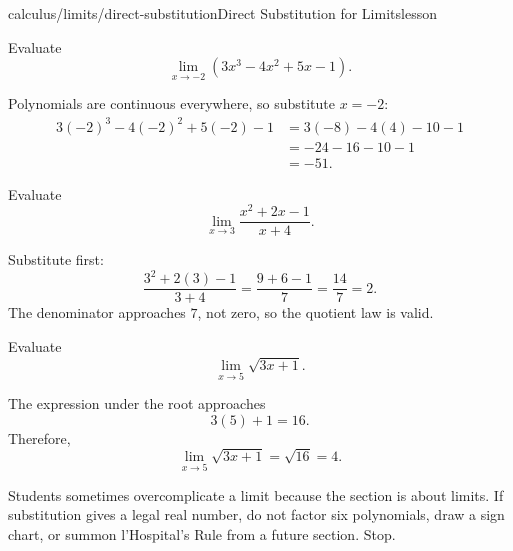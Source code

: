 \begin{webpage}{calculus/limits/direct-substitution}{Direct Substitution for Limits}{lesson}


\begin{bgexample}[title={Polynomial substitution}]
Evaluate
\[
  \lim_{x\to-2}(3x^3-4x^2+5x-1).
\]

\begin{bgsolution}
Polynomials are continuous everywhere, so substitute \(x=-2\):
\begin{align*}
3(-2)^3-4(-2)^2+5(-2)-1
&=3(-8)-4(4)-10-1\\
&=-24-16-10-1\\
&=\boxed{-51}.
\end{align*}
\end{bgsolution}
\end{bgexample}

\begin{bgexample}[title={Rational function with a safe denominator}]
Evaluate
\[
  \lim_{x\to3}\frac{x^2+2x-1}{x+4}.
\]

\begin{bgsolution}
Substitute first:
\[
  \frac{3^2+2(3)-1}{3+4}
  =\frac{9+6-1}{7}
  =\frac{14}{7}
  =\boxed{2}.
\]
The denominator approaches \(7\), not zero, so the quotient law is valid.
\end{bgsolution}
\end{bgexample}

\begin{bgexample}[title={A root function}]
Evaluate
\[
  \lim_{x\to5}\sqrt{3x+1}.
\]

\begin{bgsolution}
The expression under the root approaches
\[
  3(5)+1=16.
\]
Therefore,
\[
  \lim_{x\to5}\sqrt{3x+1}=\sqrt{16}=\boxed{4}.
\]
\end{bgsolution}
\end{bgexample}

\begin{bgmistake}
Students sometimes overcomplicate a limit because the section is about limits. If substitution gives a legal real number, do not factor six polynomials, draw a sign chart, or summon l'Hospital's Rule from a future section. Stop.
\end{bgmistake}
\end{webpage}

